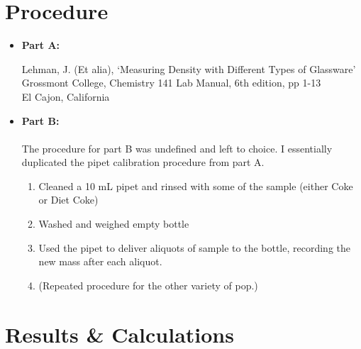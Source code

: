 \documentclass[fleqn,titlepage]{article}
\begin{document}
\newpage
\section*{Procedure}
\begin{itemize}
  \item  \textbf{Part A:} \\
    \begin{addmargin}[1em]{1em}
      Lehman, J. (Et alia), `Measuring Density with Different Types of Glassware' \\
      Grossmont College, Chemistry 141 Lab Manual, 6th edition, pp 1-13 \\
      El Cajon, California
    \end{addmargin}
  \item \textbf{Part B:}
    \paragraph{} The procedure for part B was undefined and left to choice. I essentially duplicated the pipet calibration procedure from part A.
    \begin{enumerate}
      \item Cleaned a 10 mL pipet and rinsed with some of the sample (either Coke or Diet Coke)
      \item Washed and weighed empty bottle 
      \item Used the pipet to deliver aliquots of sample to the bottle, recording the new mass after each aliquot.
      \item (Repeated procedure for the other variety of pop.)
    \end{enumerate}
\end{itemize}

\section*{Results \& Calculations}
\end{document}
